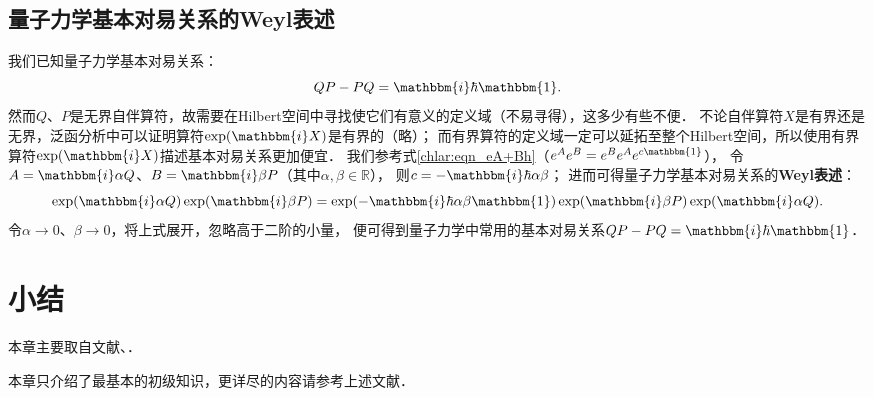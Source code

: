 \subsection{量子力学基本对易关系的Weyl表述}

我们已知量子力学基本对易关系：
\begin{equation}
	QP -PQ = \mathbbm{i}\hbar \mathbbm{1} .
\end{equation}
然而$Q$、$P$是无界自伴算符，故需要在Hilbert空间中寻找使它们有意义的定义域（不易寻得），这多少有些不便．
不论自伴算符$X$是有界还是无界，泛函分析中可以证明算符$\exp(\mathbbm{i}X)$是有界的（略）；
而有界算符的定义域一定可以延拓至整个Hilbert空间，所以使用有界算符$\exp(\mathbbm{i}X)$描述基本对易关系更加便宜．
我们参考式\eqref{chlar:eqn_eA+Bh}（$e^A e^B = e^B e^A e^{c\mathbbm{1}}$），
令$A=\mathbbm{i} \alpha Q$、$B=\mathbbm{i} \beta P$（其中$\alpha,\beta \in \mathbb{R}$），
则$c=-\mathbbm{i}\hbar \alpha \beta $；
进而可得量子力学基本对易关系的{\heiti \bfseries Weyl表述}：
\begin{equation}\label{chhs:eqn_Weyl-QP}
	\exp(\mathbbm{i}\alpha Q) \exp(\mathbbm{i}\beta P) 
	= \exp(-\mathbbm{i}\hbar \alpha \beta \mathbbm{1}) 
	\exp(\mathbbm{i}\beta P) \exp(\mathbbm{i}\alpha Q) .
\end{equation}
令$\alpha \to 0$、$\beta \to 0$，将上式展开，忽略高于二阶的小量，
便可得到量子力学中常用的基本对易关系$QP -PQ = \mathbbm{i}\hbar\mathbbm{1}$．






\section*{小结}

本章主要取自文献\parencite{Kreyszig-1991}、\parencite{zhang-lin-2021}．

本章只介绍了最基本的初级知识，更详尽的内容请参考上述文献．

\endinput
